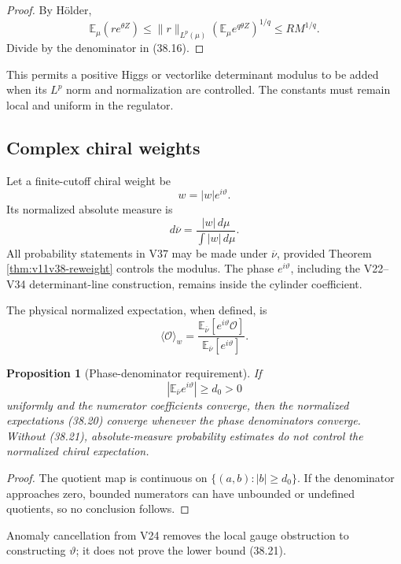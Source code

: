 \documentclass[11pt]{article}
\newtheorem{proposition}[theorem]{Proposition}
\begin{document}
\begin{proof}
By Hölder,
\[
 \mathbb E_\mu(re^{\theta Z})
 \leq
 \|r\|_{L^p(\mu)}
 \left(\mathbb E_\mu e^{q\theta Z}\right)^{1/q}
 \leq RM^{1/q}.
\]
Divide by the denominator in (38.16).
\end{proof}

This permits a positive Higgs or vectorlike determinant modulus to be
added when its \(L^p\) norm and normalization are controlled.  The
constants must remain local and uniform in the regulator.

\subsection{Complex chiral weights}

Let a finite-cutoff chiral weight be
\[
 w=|w|e^{i\vartheta}.
 \tag{38.18}
\]
Its normalized absolute measure is
\[
 d\overline\nu
 =
 \frac{|w|\,d\mu}{\int|w|\,d\mu}.
 \tag{38.19}
\]
All probability statements in V37 may be made under
\(\overline\nu\), provided Theorem \ref{thm:v11v38-reweight} controls
the modulus.  The phase \(e^{i\vartheta}\), including the V22--V34
determinant-line construction, remains inside the cylinder
coefficient.

The physical normalized expectation, when defined, is
\[
 \langle\mathcal O\rangle_w
 =
 \frac{
 \mathbb E_{\overline\nu}
 [e^{i\vartheta}\mathcal O]
 }{
 \mathbb E_{\overline\nu}
 [e^{i\vartheta}]
 }.
 \tag{38.20}
\]

\begin{proposition}[Phase-denominator requirement]
\label{prop:v11v38-phase-denominator}
If
\[
 \left|
 \mathbb E_{\overline\nu}e^{i\vartheta}
 \right|\geq d_0>0
 \tag{38.21}
\]
uniformly and the numerator coefficients converge, then the normalized
expectations (38.20) converge whenever the phase denominators converge.
Without (38.21), absolute-measure probability estimates do not control
the normalized chiral expectation.
\end{proposition}

\begin{proof}
The quotient map is continuous on
\(\{(a,b):|b|\geq d_0\}\).  If the denominator approaches zero, bounded
numerators can have unbounded or undefined quotients, so no conclusion
follows.
\end{proof}

Anomaly cancellation from V24 removes the local gauge obstruction to
constructing \(\vartheta\); it does not prove the lower bound (38.21).
\end{document}
